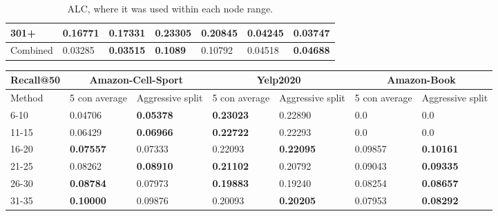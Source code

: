 \begin{table*}[h!]
\begin{tabular}{|l|l|l||l|l||l|l|}
        301+     & 0.16771                                 & \textbf{0.17331}               & \textbf{0.23305}                 & 0.20845          & \textbf{0.04245} & 0.03747          \\ \hline
        Combined & 0.03285                                 & \textbf{0.03515}               & \textbf{0.1089 }                 & 0.10792          & 0.04518          & \textbf{0.04688} \\ \hline
    \end{tabular}
    \caption{ALC, where it was used within each node range.}
    \label{tab:ALC-degree-based-ndcg}
\end{table*}

\begin{table*}[h!]
    \centering
    \begin{tabular}{|l|l|l||l|l||l|l|}
        \hline
        Recall@50 & \multicolumn{2}{c||}{Amazon-Cell-Sport} & \multicolumn{2}{c||}{Yelp2020} & \multicolumn{2}{c|}{Amazon-Book}                                                          \\ \hline
        Method    & 5 con average                           & Aggressive split               & 5 con average                    & Aggressive split & 5 con average    & Aggressive split \\ \hline
        6-10      & 0.04706                                 & \textbf{0.05378}               & \textbf{0.23023}                 & 0.22890          & 0.0              & 0.0              \\ \hline
        11-15     & 0.06429                                 & \textbf{0.06966}               & \textbf{0.22722}                 & 0.22293          & 0.0              & 0.0              \\ \hline
        16-20     & \textbf{0.07557}                        & 0.07333                        & 0.22093                          & \textbf{0.22095} & 0.09857          & \textbf{0.10161} \\ \hline
        21-25     & 0.08262                                 & \textbf{0.08910}               & \textbf{0.21102}                 & 0.20792          & 0.09043          & \textbf{0.09335} \\ \hline
        26-30     & \textbf{0.08784}                        & 0.07973                        & \textbf{0.19883}                 & 0.19240          & 0.08254          & \textbf{0.08657} \\ \hline
        31-35     & \textbf{0.10000}                        & 0.09876                        & 0.20093                          & \textbf{0.20205} & 0.07953          & \textbf{0.08292} \\ \hline

\end{tabular}
\end{table*}
